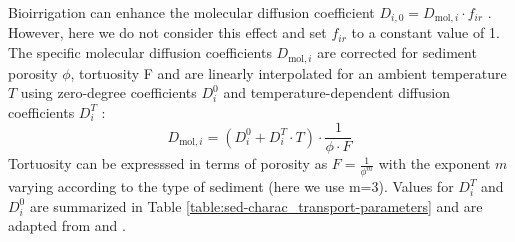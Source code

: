 \documentclass[gmd, manuscript]{copernicus}
\begin{document}
Bioirrigation can enhance the molecular diffusion coefficient $D_{i,0}=D_{\mathrm{mol},i}\cdot f_{ir}$ \citep{soetaert1996dynamic}. However, here we do not consider this effect 
and set $f_{ir}$ to a constant value of 1. The specific molecular diffusion coefficients $D_{\mathrm{mol},i}$ are corrected for sediment porosity $\phi$, tortuosity F and are linearly interpolated for an ambient temperature $T$ using zero-degree 
coefficients $D^0_i$ and temperature-dependent diffusion coefficients $D^T_i$ \citep[compare ][]{gypens_simple_2008}:
\begin{equation*}
 D_{\mathrm{mol},i} = (D^0_i + D^T_i \cdot T )\cdot \frac{1}{\phi\cdot F}
\end{equation*}
Tortuosity can be expresssed in terms of porosity as $F = \frac{1}{\phi^m}$ \citep{ullman_diffusion_1982} with the exponent $m$ varying according to the type of sediment (here we use m=3). 
Values for $D^T_i$ and $D^0_i$ are summarized in Table \ref{table:sed-charac_transport-parameters} and are adapted from \citet{Li_diffusion_1974} and \citet{gypens_simple_2008}.
\end{document}
